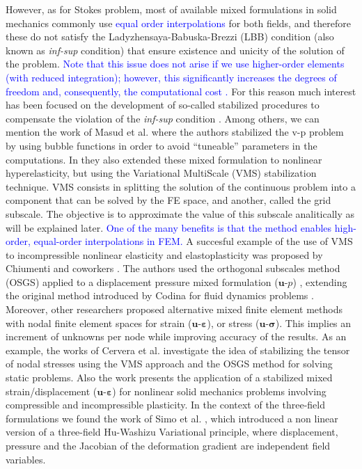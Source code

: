 \documentclass[11pt,english]{article}
\newcommand{\LM}[1]{\textcolor{blue}{#1}}
\begin{document}
However, as for Stokes problem, most of available mixed formulations in solid mechanics commonly use \LM{equal order interpolations} for both fields, and therefore these do not satisfy the Ladyzhensaya-Babuska-Brezzi (LBB) condition \cite{brezzi2012mixed} (also known as \textit{inf-sup} condition) that ensure existence and unicity of the  solution of the problem. \LM{Note that this issue does not arise if we use higher-order elements (with reduced integration); however, this significantly increases the degrees of freedom and, consequently, the computational cost \cite{rank2005high}.} For this reason much interest has been focused on the development of so-called stabilized procedures to compensate the violation of the \textit{inf-sup} condition \cite{babuvska1971error}.
Among others, we can mention the work of Masud et al. \cite{nakshatrala2008finite} where the authors stabilized the v-p problem by using bubble functions in order to avoid ``tuneable''  parameters in the computations. In \cite{masud2013framework} they also extended these mixed formulation to nonlinear hyperelasticity, but   using the Variational MultiScale (VMS)  stabilization technique. VMS consists in splitting the solution of the continuous problem into a component that can be solved by the FE space, and another, called the grid subscale. The objective is to approximate the value of this subscale analitically as will be explained later. \LM{One of the many benefits is that the method enables high-order, equal-order interpolations in FEM.}
A succesful example of the use of VMS to incompressible nonlinear elasticity and elastoplasticity was proposed by Chiumenti and coworkers \cite{chiumenti2002stabilized}. The authors used the orthogonal subscales method (OSGS) applied to a displacement pressure mixed formulation ($\boldsymbol{u}$-$p$) , extending the original method introduced by Codina for fluid dynamics problems \cite{codina2000stabilization}.
Moreover, other researchers proposed alternative mixed  finite element methods  with nodal finite element spaces for strain ($\boldsymbol{u}$-$\boldsymbol{\varepsilon}$), or stress ($\boldsymbol{u}$-$\boldsymbol{\sigma}$). This implies an increment of unknowns per node while improving accuracy of the results. As an example, the works of Cervera et al. \cite{cervera2010mixeda,cervera2010mixedb} investigate the idea of stabilizing the tensor of nodal stresses using the VMS approach and the OSGS method for solving static problems. Also the work \cite{cervera2015mixed} presents the application of a stabilized mixed strain/displacement ($\boldsymbol{u}$-$\boldsymbol{\varepsilon}$) for  nonlinear solid mechanics problems involving compressible and incompressible plasticity. In the context of the three-field formulations we found the work of Simo et al. \cite{simo1985variational}, which introduced a non linear version of a three-field Hu-Washizu Variational principle, where displacement, pressure and the Jacobian of the deformation gradient are independent field variables.
\end{document}
